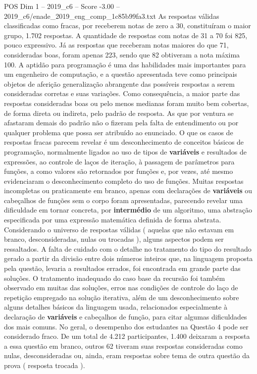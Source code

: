 \begin{textsample}{POS Dim 1 – 2019\_c6 – Score -3.00 – 2019\_c6/enade\_2019\_eng\_comp\_1c85b99fa3.txt}
As respostas válidas classificadas como fracas, por receberem notas de zero a 30, constituíram o maior grupo, 1.702 respostas.
A quantidade de respostas com notas de 31 a 70 foi 825, pouco expressivo.
Já as respostas que receberam notas maiores do que 71, consideradas boas, foram apenas 223, sendo que 82 obtiveram a nota máxima 100.
A aptidão para programação é uma das habilidades mais importantes para um engenheiro de computação, e a questão apresentada teve como principais objetos de aferição generalização abrangente das possíveis respostas a serem consideradas corretas e suas variações.
Como consequência, a maior parte das respostas consideradas boas ou pelo menos medianas foram muito bem cobertas, de forma direta ou indireta, pelo padrão de resposta.
As que por ventura se afastaram demais do padrão não o fizeram pela falta de entendimento ou por qualquer problema que possa ser atribuído ao enunciado.
O que os casos de respostas fracas parecem revelar é um desconhecimento de conceitos básicos de programação, normalmente ligados ao uso de tipos de \textbf{variáveis} e resultados de expressões, ao controle de laços de iteração, à passagem de parâmetros para funções, a como valores são retornados por funções e, por vezes, até mesmo evidenciaram o desconhecimento completo do uso de funções.
Muitas respostas incompletas ou praticamente em branco, apenas com declarações de \textbf{variáveis} ou cabeçalhos de funções sem o corpo foram apresentadas, parecendo revelar uma dificuldade em tornar concreta, por \textbf{intermédio} de um algoritmo, uma abstração especificada por uma expressão matemática definida de forma abstrata.
Considerando o universo de respostas válidas ( aquelas que não estavam em branco, desconsideradas, nulas ou trocadas ), alguns aspectos podem ser ressaltados.
A falta de cuidado com o detalhe no tratamento do tipo do resultado gerado a partir da divisão entre dois números inteiros que, na linguagem proposta pela questão, levaria a resultados errados, foi encontrada em grande parte das soluções.
O tratamento inadequado do caso base da recursão foi também observado em muitas das soluções, erros nas condições de controle do laço de repetição empregado na solução iterativa, além de um desconhecimento sobre alguns detalhes básicos da linguagem usada, relacionados especialmente à declaração de \textbf{variáveis} e cabeçalhos de função, para citar algumas dificuldades dos mais comuns.
No geral, o desempenho dos estudantes na Questão 4 pode ser considerado fraco.
De um total de 4.212 participantes, 1.400 deixaram a resposta a essa questão em branco, outros 62 tiveram suas respostas consideradas como nulas, desconsideradas ou, ainda, eram respostas sobre tema de outra questão da prova ( resposta trocada ).

\end{textsample}
